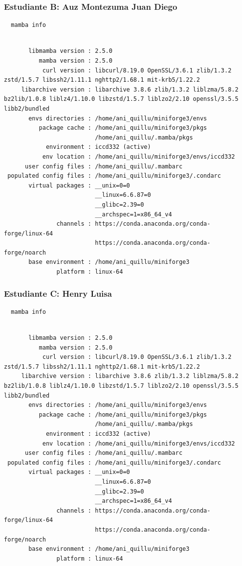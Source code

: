 \documentclass{article}
\begin{document}
\subsubsection{Estudiante B: Auz Montezuma Juan Diego}
\label{sec:orgc72d749}
\begin{verbatim}
  mamba info
\end{verbatim}
\begin{verbatim}

       libmamba version : 2.5.0
          mamba version : 2.5.0
           curl version : libcurl/8.19.0 OpenSSL/3.6.1 zlib/1.3.2 zstd/1.5.7 libssh2/1.11.1 nghttp2/1.68.1 mit-krb5/1.22.2
     libarchive version : libarchive 3.8.6 zlib/1.3.2 liblzma/5.8.2 bz2lib/1.0.8 liblz4/1.10.0 libzstd/1.5.7 liblzo2/2.10 openssl/3.5.5 libb2/bundled
       envs directories : /home/ani_quillu/miniforge3/envs
          package cache : /home/ani_quillu/miniforge3/pkgs
                          /home/ani_quillu/.mamba/pkgs
            environment : iccd332 (active)
           env location : /home/ani_quillu/miniforge3/envs/iccd332
      user config files : /home/ani_quillu/.mambarc
 populated config files : /home/ani_quillu/miniforge3/.condarc
       virtual packages : __unix=0=0
                          __linux=6.6.87=0
                          __glibc=2.39=0
                          __archspec=1=x86_64_v4
               channels : https://conda.anaconda.org/conda-forge/linux-64
                          https://conda.anaconda.org/conda-forge/noarch
       base environment : /home/ani_quillu/miniforge3
               platform : linux-64
\end{verbatim}
\subsubsection{Estudiante C: Henry Luisa}
\label{sec:orgabeb574}
\begin{verbatim}
  mamba info
\end{verbatim}
\begin{verbatim}

       libmamba version : 2.5.0
          mamba version : 2.5.0
           curl version : libcurl/8.19.0 OpenSSL/3.6.1 zlib/1.3.2 zstd/1.5.7 libssh2/1.11.1 nghttp2/1.68.1 mit-krb5/1.22.2
     libarchive version : libarchive 3.8.6 zlib/1.3.2 liblzma/5.8.2 bz2lib/1.0.8 liblz4/1.10.0 libzstd/1.5.7 liblzo2/2.10 openssl/3.5.5 libb2/bundled
       envs directories : /home/ani_quillu/miniforge3/envs
          package cache : /home/ani_quillu/miniforge3/pkgs
                          /home/ani_quillu/.mamba/pkgs
            environment : iccd332 (active)
           env location : /home/ani_quillu/miniforge3/envs/iccd332
      user config files : /home/ani_quillu/.mambarc
 populated config files : /home/ani_quillu/miniforge3/.condarc
       virtual packages : __unix=0=0
                          __linux=6.6.87=0
                          __glibc=2.39=0
                          __archspec=1=x86_64_v4
               channels : https://conda.anaconda.org/conda-forge/linux-64
                          https://conda.anaconda.org/conda-forge/noarch
       base environment : /home/ani_quillu/miniforge3
               platform : linux-64
\end{verbatim}
\end{document}
